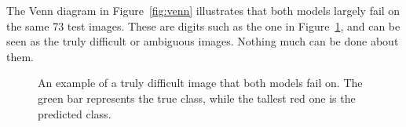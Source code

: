 \documentclass{article}
\begin{document}
The Venn diagram in Figure~\ref{fig:venn} illustrates that both models largely fail on the same 73 test images. These are digits such as the one in Figure~\ref{fig:difficult}, and can be seen as the truly difficult or ambiguous images. Nothing much can be done about them.

\begin{figure}[h!]
\begin{minipage}[c]{.3\hsize}
\centering
{}
\end{minipage} %
\begin{minipage}[c]{.7\hsize}
\centering
{}\par

\end{minipage}
\caption{An example of a truly difficult image that both models fail on. The green bar represents the true class, while the tallest red one is the predicted class.}
\label{fig:difficult}
\end{figure}
\end{document}

